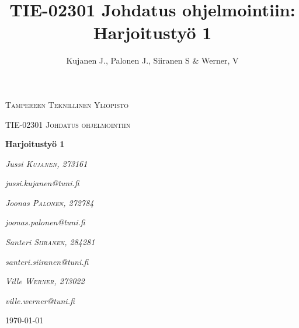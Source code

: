 \documentclass[12pt]{report} %
\title{TIE-02301 Johdatus ohjelmointiin: Harjoitustyö 1}
\author{Kujanen J., Palonen J., Siiranen S \& Werner, V}
\begin{document}

    \begin{titlepage}
        \centering
        {\scshape\LARGE Tampereen Teknillinen Yliopisto \par}
        \vspace{1cm}
        {\scshape\Large TIE-02301 Johdatus ohjelmointiin\par}
        \vspace{2.5cm}
        {\huge\bfseries Harjoitustyö 1 \par}
        \vspace{4cm}
        {\Large\itshape{Jussi} \textsc{Kujanen}, \textit{273161}\par}
	    {\quad \textit{jussi.kujanen@tuni.fi \newline} }
        {\Large\itshape Joonas \textsc{Palonen}, \textit{272784}\par}
	    {\quad \textit{joonas.palonen@tuni.fi \newline} }
        {\Large\itshape Santeri \textsc{Siiranen}, \textit{284281}\par}
	    {\quad \textit{santeri.siiranen@tuni.fi \newline} }
        {\Large\itshape Ville \textsc{Werner}, \textit{273022}\par}
	    {\quad \quad \textit{ville.werner@tuni.fi \newline} }
        
        \vfill
    
        \vfill
    
        {\large \today \par}
    \end{titlepage}

    
    \setcounter{page}{1}                    %
    


    {
        \hypersetup{linkcolor=black}
        \tableofcontents  %
        \listoftables
        \listoffigures
    
    }
    
\end{document}
